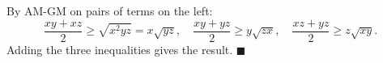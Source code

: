 By AM-GM on pairs of terms on the left:
\[\dfrac{xy+xz}2\ge\sqrt{x^2yz}=x\sqrt{yz},\quad\dfrac{xy+yz}2\ge y\sqrt{zx},\quad\dfrac{xz+yz}2\ge z\sqrt{xy}.\]
Adding the three inequalities gives the result. $\blacksquare$
